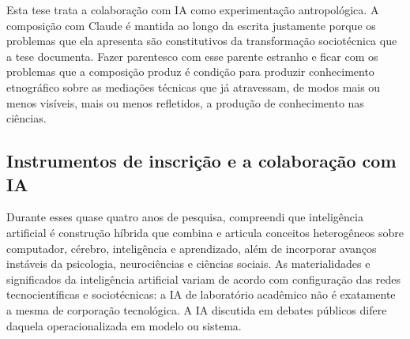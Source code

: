 %

Esta tese trata a colaboração com IA como experimentação antropológica. A composição com Claude é mantida ao longo da escrita justamente porque os problemas que ela apresenta são constitutivos da transformação sociotécnica que a tese documenta. Fazer parentesco com esse parente estranho e ficar com os problemas que a composição produz é condição para produzir conhecimento etnográfico sobre as mediações técnicas que já atravessam, de modos mais ou menos visíveis, mais ou menos refletidos, a produção de conhecimento nas ciências.

\subsection*{Instrumentos de inscrição e a colaboração com IA}

Durante esses quase quatro anos de pesquisa, compreendi que inteligência artificial é construção híbrida que combina e articula conceitos heterogêneos sobre computador, cérebro, inteligência e aprendizado, além de incorporar avanços instáveis da psicologia, neurociências e ciências sociais. As materialidades e significados da inteligência artificial variam de acordo com configuração das redes tecnocientíficas e sociotécnicas: a IA de laboratório acadêmico não é exatamente a mesma de corporação tecnológica. A IA discutida em debates públicos difere daquela operacionalizada em modelo ou sistema.

